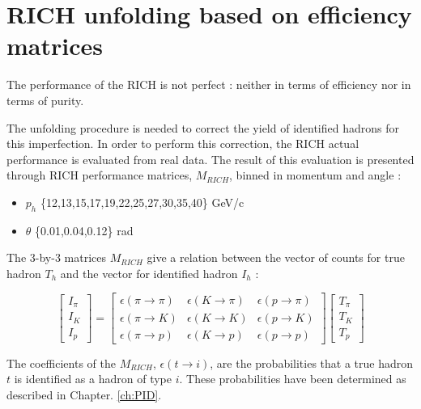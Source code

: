 
\section{RICH unfolding based on efficiency matrices}

The performance of the RICH is not perfect : neither in terms of efficiency nor in terms
of purity.

The unfolding procedure is needed to correct the yield of identified hadrons for this imperfection.
In order to perform this correction, the RICH actual performance is evaluated from real data. The result of
this evaluation is presented through RICH performance matrices, $M_{RICH}$, binned in momentum
and angle :

\begin{itemize}
  \item $p_h$ \{12,13,15,17,19,22,25,27,30,35,40\} GeV/c
  \item $\theta$ \{0.01,0.04,0.12\} rad
\end{itemize}

The 3-by-3 matrices $M_{RICH}$ give a relation between the vector of counts for true hadron $T_h$ and the vector for identified hadron $I_h$ :

\begin{equation}
\begin{bmatrix}
I_{\pi} \\
I_K \\
I_p
\end{bmatrix}
=
\begin{bmatrix}
\epsilon(\pi \rightarrow \pi) & \epsilon(K \rightarrow \pi) & \epsilon(p \rightarrow \pi)\\
\epsilon(\pi \rightarrow K) & \epsilon(K \rightarrow K) & \epsilon(p \rightarrow K) \\
\epsilon(\pi \rightarrow p) & \epsilon(K \rightarrow p) & \epsilon(p \rightarrow p)
\end{bmatrix}
\begin{bmatrix}
T_{\pi} \\
T_K \\
T_p
\end{bmatrix}
\end{equation}

The coefficients of the $M_{RICH}$, $\epsilon(t \rightarrow i)$, are the probabilities that a true hadron
$t$ is identified as a hadron of type $i$. These probabilities have been determined as described in Chapter. \ref{ch:PID}.


